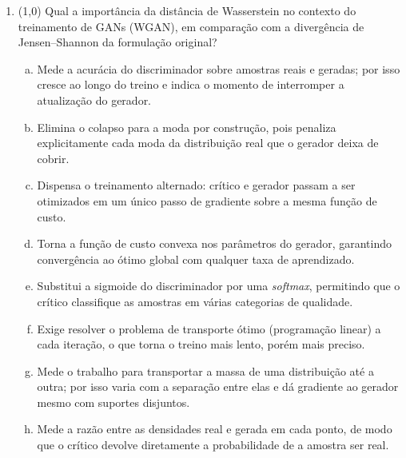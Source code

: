 \documentclass[11pt,a4paper]{article}
\begin{document}
\begin{enumerate}[1)]
\pagebreak
\item (1{,}0) Qual a importância da distância de Wasserstein no contexto do treinamento de GANs (WGAN), em comparação com a divergência de Jensen--Shannon da formulação original?
\begin{enumerate}[a)]
    \item Mede a acurácia do discriminador sobre amostras reais e geradas; por isso cresce ao longo do treino e indica o momento de interromper a atualização do gerador.
    \item Elimina o colapso para a moda por construção, pois penaliza explicitamente cada moda da distribuição real que o gerador deixa de cobrir.
    \item Dispensa o treinamento alternado: crítico e gerador passam a ser otimizados em um único passo de gradiente sobre a mesma função de custo.
    \item Torna a função de custo convexa nos parâmetros do gerador, garantindo convergência ao ótimo global com qualquer taxa de aprendizado.
    \item Substitui a sigmoide do discriminador por uma \textit{softmax}, permitindo que o crítico classifique as amostras em várias categorias de qualidade.
    \item Exige resolver o problema de transporte ótimo (programação linear) a cada iteração, o que torna o treino mais lento, porém mais preciso.
    \item Mede o trabalho para transportar a massa de uma distribuição até a outra; por isso varia com a separação entre elas e dá gradiente ao gerador mesmo com suportes disjuntos.
    \item Mede a razão entre as densidades real e gerada em cada ponto, de modo que o crítico devolve diretamente a probabilidade de a amostra ser real.
\end{enumerate}


\end{enumerate}
\end{document}
